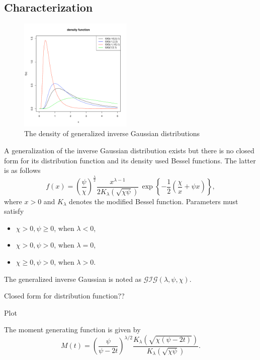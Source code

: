 \subsection{Characterization}
\begin{figure}
  \vspace{-60pt}
  \begin{center}
    \includegraphics[width=0.48\textwidth]{img/gigzoom}
  \end{center}
  \vspace{-20pt}
  \caption{The density of generalized inverse Gaussian distributions}
  \vspace{-20pt}
\end{figure}
A generalization of the inverse Gaussian distribution exists but there is no
closed form for its distribution function and its density used Bessel functions.
The latter is as follows
$$\label{eq:densgig}
 f(x) = \left(\frac{\psi}{\chi}\right)^{\frac{\lambda}{2}}
  \frac{x^{\lambda-1}}{2K_\lambda(\sqrt{\chi\psi})} \,
  \exp\left\{-\frac{1}{2}\left(\frac{\chi}{x}+\psi x
    \right)\right\},
$$
where $x>0$ and $K_\lambda$ denotes the modified Bessel function. Parameters must satisfy
\begin{itemize}
\item $\chi > 0, \psi \geq 0$, when $\lambda < 0 $,
\item $\chi > 0, \psi > 0$, when $\lambda = 0$,
\item $\chi \geq 0, \psi > 0$, when $\lambda > 0 $.
\end{itemize} 
The generalized inverse Gaussian is noted as $\mathcal G \mathcal I \mathcal G(\lambda,\psi,\chi)$.

Closed form for distribution function??

Plot

The moment generating function is given by
\begin{equation}
  M(t) = \left(\frac{\psi}{\psi - 2 t}\right)^{\lambda / 2}
  \frac{K_\lambda(\sqrt{\chi (\psi - 2 t)})}{K_\lambda(\sqrt{\chi \psi})}.
\end{equation}


